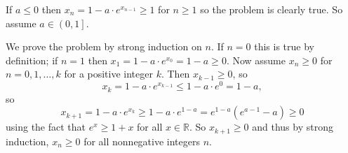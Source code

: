 If $a\leq0$ then $x_n=1-a\cdot e^{x_{n-1}}\geq1$ for $n\geq1$ so the problem is clearly true. So assume $a\in\left(0,1\right]$.

We prove the problem by strong induction on $n$. If $n=0$ this is true by definition; if $n=1$ then $x_1=1-a\cdot e^{x_0}=1-a\geq0$. Now assume $x_n\geq0$ for $n=0,1,\ldots,k$ for a positive integer $k$. Then $x_{k-1}\geq0$, so \[x_k=1-a\cdot e^{x_{k-1}}\leq1-a\cdot e^0=1-a,\] so \[x_{k+1}=1-a\cdot e^{x_k}\geq1-a\cdot e^{1-a}=e^{1-a}\left(e^{a-1}-a\right)\geq0\] using the fact that $e^x\geq1+x$ for all $x\in\mathbb{R}$. So $x_{k+1}\geq0$ and thus by strong induction, $x_n\geq0$ for all nonnegative integers $n$.